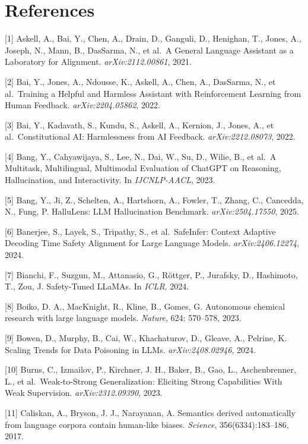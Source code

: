 \section{References}\label{references}

{[}1{]} Askell, A., Bai, Y., Chen, A., Drain, D., Ganguli, D., Henighan, T., Jones, A., Joseph, N., Mann, B., DasSarma, N., et al.~A General Language Assistant as a Laboratory for Alignment. \emph{arXiv:2112.00861}, 2021.

{[}2{]} Bai, Y., Jones, A., Ndousse, K., Askell, A., Chen, A., DasSarma, N., et al.~Training a Helpful and Harmless Assistant with Reinforcement Learning from Human Feedback. \emph{arXiv:2204.05862}, 2022.

{[}3{]} Bai, Y., Kadavath, S., Kundu, S., Askell, A., Kernion, J., Jones, A., et al.~Constitutional AI: Harmlessness from AI Feedback. \emph{arXiv:2212.08073}, 2022.

{[}4{]} Bang, Y., Cahyawijaya, S., Lee, N., Dai, W., Su, D., Wilie, B., et al.~A Multitask, Multilingual, Multimodal Evaluation of ChatGPT on Reasoning, Hallucination, and Interactivity. In \emph{IJCNLP-AACL}, 2023.

{[}5{]} Bang, Y., Ji, Z., Schelten, A., Hartshorn, A., Fowler, T., Zhang, C., Cancedda, N., Fung, P. HalluLens: LLM Hallucination Benchmark. \emph{arXiv:2504.17550}, 2025.

{[}6{]} Banerjee, S., Layek, S., Tripathy, S., et al.~SafeInfer: Context Adaptive Decoding Time Safety Alignment for Large Language Models. \emph{arXiv:2406.12274}, 2024.

{[}7{]} Bianchi, F., Suzgun, M., Attanasio, G., Röttger, P., Jurafsky, D., Hashimoto, T., Zou, J. Safety-Tuned LLaMAs. In \emph{ICLR}, 2024.

{[}8{]} Boiko, D. A., MacKnight, R., Kline, B., Gomes, G. Autonomous chemical research with large language models. \emph{Nature}, 624: 570--578, 2023.

{[}9{]} Bowen, D., Murphy, B., Cai, W., Khachaturov, D., Gleave, A., Pelrine, K. Scaling Trends for Data Poisoning in LLMs. \emph{arXiv:2408.02946}, 2024.

{[}10{]} Burns, C., Izmailov, P., Kirchner, J. H., Baker, B., Gao, L., Aschenbrenner, L., et al.~Weak-to-Strong Generalization: Eliciting Strong Capabilities With Weak Supervision. \emph{arXiv:2312.09390}, 2023.

{[}11{]} Caliskan, A., Bryson, J. J., Narayanan, A. Semantics derived automatically from language corpora contain human-like biases. \emph{Science}, 356(6334):183--186, 2017.

